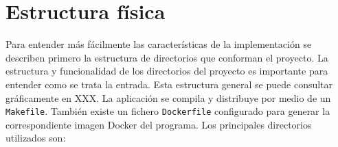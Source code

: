 









\section{Estructura física}

Para entender más fácilmente las características de la implementación se describen primero la estructura de directorios que conforman el proyecto. 
La estructura y funcionalidad de los directorios del proyecto es importante para entender como se trata la entrada. Esta estructura general se puede consultar gráficamente en XXX. La aplicación se compila y distribuye por medio de un \verb|Makefile|. También existe un fichero \verb|Dockerfile| configurado para generar la correspondiente imagen Docker del programa. Los principales directorios utilizados son:


